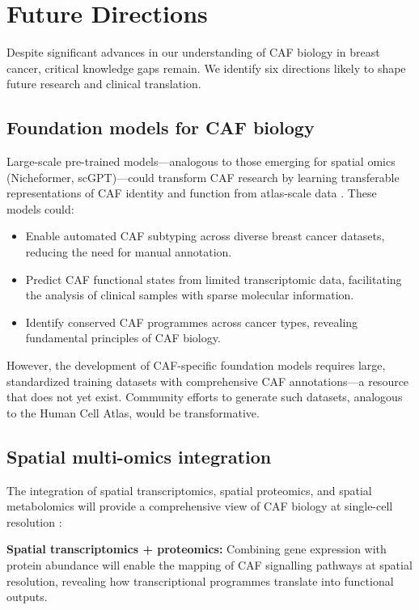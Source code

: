 \section{Future Directions}
\label{sec:future}

Despite significant advances in our understanding of CAF biology in breast cancer, critical knowledge gaps remain. We identify six directions likely to shape future research and clinical translation.

\subsection{Foundation models for CAF biology}

Large-scale pre-trained models---analogous to those emerging for spatial omics (Nicheformer, scGPT)---could transform CAF research by learning transferable representations of CAF identity and function from atlas-scale data \citep{cui2024scgpt}. These models could:

\begin{itemize}
  \item Enable automated CAF subtyping across diverse breast cancer datasets, reducing the need for manual annotation.
  \item Predict CAF functional states from limited transcriptomic data, facilitating the analysis of clinical samples with sparse molecular information.
  \item Identify conserved CAF programmes across cancer types, revealing fundamental principles of CAF biology.
\end{itemize}

However, the development of CAF-specific foundation models requires large, standardized training datasets with comprehensive CAF annotations---a resource that does not yet exist. Community efforts to generate such datasets, analogous to the Human Cell Atlas, would be transformative.

\subsection{Spatial multi-omics integration}

The integration of spatial transcriptomics, spatial proteomics, and spatial metabolomics will provide a comprehensive view of CAF biology at single-cell resolution \citep{stahl2016visualization}:

\textbf{Spatial transcriptomics + proteomics:} Combining gene expression with protein abundance will enable the mapping of CAF signalling pathways at spatial resolution, revealing how transcriptional programmes translate into functional outputs.

